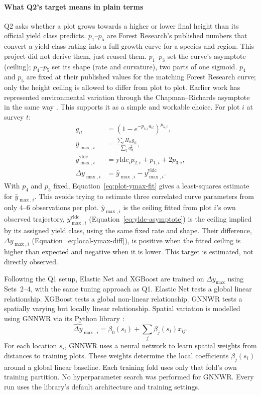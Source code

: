 \documentclass[logo,msc,ai]{infthesis}           %
\begin{document}
\paragraph*{What Q2's target means in plain terms} Q2 asks whether a plot grows towards a higher or lower final height than its official yield class predicts. $p_1$--$p_5$ are Forest Research's published numbers that convert a yield-class rating into a full growth curve for a species and region. This project did not derive them, just reused them. $p_1$--$p_3$ set the curve's asymptote (ceiling); $p_4$--$p_5$ set its shape (rate and curvature), two parts of one sigmoid. $p_4$ and $p_5$ are fixed at their published values for the matching Forest Research curve; only the height ceiling is allowed to differ from plot to plot. Earlier work has represented environmental variation through the Chapman--Richards asymptote in the same way \cite{scolforo2013Dominant_C2_CR}. This supports it as a simple and workable choice. For plot $i$ at survey $t$:
\begin{align}
g_{it} &= \left(1-e^{-p_{4,i}a_{it}}\right)^{p_{5,i}}, \label{eq:git-curve} \\
\hat y_{\max,i} &= \frac{\sum_t H_{it}g_{it}}{\sum_t g_{it}^2}, \label{eq:plot-ymax-fit} \\
y_{\max,i}^{\mathrm{yldc}} &= \mathrm{yldc}_i p_{2,i}+p_{1,i}+2p_{3,i}, \label{eq:yldc-asymptote} \\
\Delta y_{\max,i} &= \hat y_{\max,i}-y_{\max,i}^{\mathrm{yldc}}. \label{eq:local-ymax-diff}
\end{align}
With $p_4$ and $p_5$ fixed, Equation~\eqref{eq:plot-ymax-fit} gives a least-squares estimate for $\hat y_{\max,i}$. This avoids trying to estimate three correlated curve parameters from only 4--6 observations per plot. $\hat y_{\max,i}$ is the ceiling fitted from plot $i$'s own observed trajectory, $y_{\max,i}^{\mathrm{yldc}}$ (Equation~\eqref{eq:yldc-asymptote}) is the ceiling implied by its assigned yield class, using the same fixed rate and shape. Their difference, $\Delta y_{\max,i}$ (Equation~\eqref{eq:local-ymax-diff}), is positive when the fitted ceiling is higher than expected and negative when it is lower. This target is estimated, not directly observed.

Following the Q1 setup, Elastic Net and XGBoost are trained on $\Delta y_{\max}$ using Sets~2--4, with the same tuning approach as Q1. Elastic Net tests a global linear relationship. XGBoost tests a global non-linear relationship. GNNWR tests a spatially varying but locally linear relationship. Spatial variation is modelled using GNNWR via its Python library \cite{du2020Geographically_C6_GWR, du2022PyGNNWR_C6_GWR}:
\begin{equation}
\widehat{\Delta y}_{\max,i} = \beta_0(s_i) + \sum_j \beta_j(s_i) x_{ij}.
\label{eq:gnnwr}
\end{equation}
For each location $s_i$, GNNWR uses a neural network to learn spatial weights from distances to training plots. These weights determine the local coefficients $\beta_j(s_i)$ around a global linear baseline. Each training fold uses only that fold's own training partition. No hyperparameter search was performed for GNNWR. Every run uses the library's default architecture and training settings.
\end{document}

